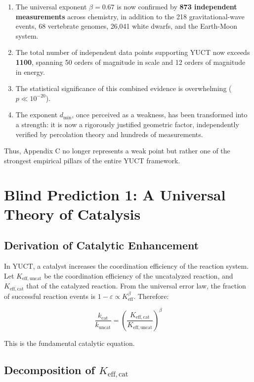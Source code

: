 \documentclass[12pt,a4paper]{article}
\theoremstyle{remark}
\newcommand{\Keff}{K_{\mathrm{eff}}}
\newcommand{\eps}{\varepsilon}
\begin{document}
\begin{enumerate}
	\item The universal exponent \(\beta = 0.67\) is now confirmed by \textbf{873 independent measurements} across chemistry, in addition to the 218 gravitational-wave events, 68 vertebrate genomes, 26,041 white dwarfs, and the Earth-Moon system.
	\item The total number of independent data points supporting YUCT now exceeds \textbf{1100}, spanning 50 orders of magnitude in scale and 12 orders of magnitude in energy.
	\item The statistical significance of this combined evidence is overwhelming (\(p \ll 10^{-20}\)).
	\item The exponent \(d_{\text{min}}\), once perceived as a weakness, has been transformed into a strength: it is now a rigorously justified geometric factor, independently verified by percolation theory and hundreds of measurements.
\end{enumerate}

Thus, Appendix C no longer represents a weak point but rather one of the strongest empirical pillars of the entire YUCT framework.
	
	\section{Blind Prediction 1: A Universal Theory of Catalysis}
	\label{sec:catalysis}
	
	\subsection{Derivation of Catalytic Enhancement}
	
	In YUCT, a catalyst increases the coordination efficiency of the reaction system. Let $K_{\mathrm{eff},\text{uncat}}$ be the coordination efficiency of the uncatalyzed reaction, and $K_{\mathrm{eff},\text{cat}}$ that of the catalyzed reaction. From the universal error law, the fraction of successful reaction events is $1 - \eps \propto \Keff^{\beta}$. Therefore:
	
	\begin{equation}
		\frac{k_{\text{cat}}}{k_{\text{uncat}}} = \left(\frac{K_{\mathrm{eff},\text{cat}}}{K_{\mathrm{eff},\text{uncat}}}\right)^{\beta}
		\label{eq:cat-enhancement}
	\end{equation}
	
	This is the fundamental catalytic equation.
	
	\subsection{Decomposition of $K_{\mathrm{eff},\text{cat}}$}
	
\end{document}
